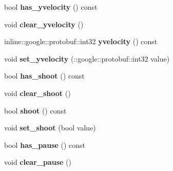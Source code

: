 \begin{DoxyCompactItemize}
\item 
\hypertarget{class_control_player_ad5d47c980b16fa21b4a1e03289f8e219}{bool {\bfseries has\-\_\-yvelocity} () const }\label{class_control_player_ad5d47c980b16fa21b4a1e03289f8e219}

\item 
\hypertarget{class_control_player_a939a11128c7ed1dfaead4df0795744c8}{void {\bfseries clear\-\_\-yvelocity} ()}\label{class_control_player_a939a11128c7ed1dfaead4df0795744c8}

\item 
\hypertarget{class_control_player_a7a039c8d2f85af678def3327245d3d80}{inline\-::google\-::protobuf\-::int32 {\bfseries yvelocity} () const }\label{class_control_player_a7a039c8d2f85af678def3327245d3d80}

\item 
\hypertarget{class_control_player_a901e221ed999443269b1e5495716ff68}{void {\bfseries set\-\_\-yvelocity} (\-::google\-::protobuf\-::int32 value)}\label{class_control_player_a901e221ed999443269b1e5495716ff68}

\item 
\hypertarget{class_control_player_a3d6e80ba43b0603ecdbd762f74810bab}{bool {\bfseries has\-\_\-shoot} () const }\label{class_control_player_a3d6e80ba43b0603ecdbd762f74810bab}

\item 
\hypertarget{class_control_player_a1cf53b17bf67474479aa8444df4ad867}{void {\bfseries clear\-\_\-shoot} ()}\label{class_control_player_a1cf53b17bf67474479aa8444df4ad867}

\item 
\hypertarget{class_control_player_a6f14f0e60e6bc7f736f16502a5a7025e}{bool {\bfseries shoot} () const }\label{class_control_player_a6f14f0e60e6bc7f736f16502a5a7025e}

\item 
\hypertarget{class_control_player_ad26250cc76bd9016bb9136535ea27e5b}{void {\bfseries set\-\_\-shoot} (bool value)}\label{class_control_player_ad26250cc76bd9016bb9136535ea27e5b}

\item 
\hypertarget{class_control_player_a431c723d3d093f961c651fb7947e99c4}{bool {\bfseries has\-\_\-pause} () const }\label{class_control_player_a431c723d3d093f961c651fb7947e99c4}

\item 
\hypertarget{class_control_player_af84ad71ae32b4fa43a1f6263e28783aa}{void {\bfseries clear\-\_\-pause} ()}\label{class_control_player_af84ad71ae32b4fa43a1f6263e28783aa}


\end{DoxyCompactItemize}
